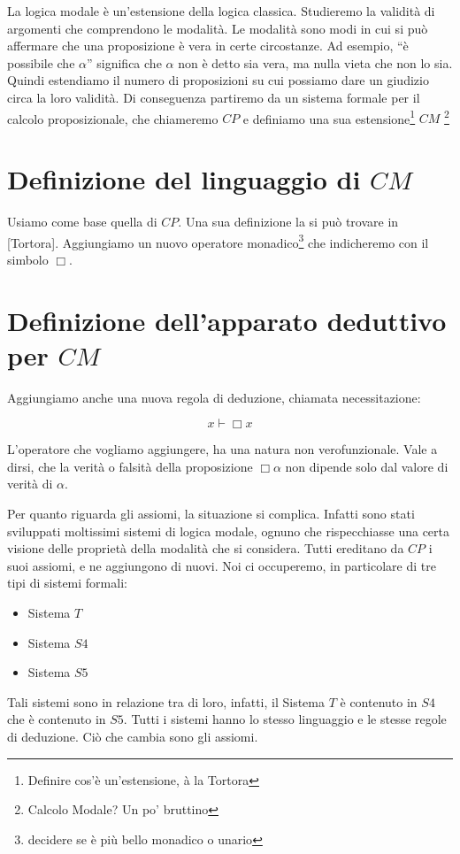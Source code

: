 \documentclass[a4paper, 12pt]{article}
\begin{document}
La logica modale è un'estensione della logica classica.
Studieremo la validità di argomenti che comprendono le modalità.
Le modalità sono modi in cui si può affermare che una proposizione è vera in certe circostanze.
Ad esempio, ``è possibile che $\alpha$'' significa che $\alpha$ non è detto sia vera, ma nulla vieta che non lo sia.
Quindi estendiamo il numero di proposizioni su cui possiamo dare un giudizio circa la loro validità.
Di conseguenza partiremo da un sistema formale per il calcolo proposizionale, che chiameremo $CP$
e definiamo una sua estensione\footnote{Definire cos'è un'estensione, à la Tortora} $CM$ \footnote{Calcolo Modale? Un po' bruttino}

\section{Definizione del linguaggio di $CM$}
Usiamo come base quella di $CP$. Una sua definizione la si può trovare in [Tortora].
Aggiungiamo un nuovo operatore monadico\footnote{decidere se è più bello monadico o unario}
che indicheremo con il simbolo $\Box$.

\section{Definizione dell'apparato deduttivo per $CM$}
Aggiungiamo anche una nuova regola di deduzione, chiamata necessitazione:

$$x \vdash \Box x$$

L'operatore che vogliamo aggiungere, ha una natura non verofunzionale. Vale a dirsi,
che la verità o falsità della proposizione $\Box \alpha$ non dipende solo
dal valore di verità di $\alpha$.

Per quanto riguarda gli assiomi, la situazione si complica. Infatti sono stati sviluppati moltissimi sistemi di logica modale,
ognuno che rispecchiasse una certa visione delle proprietà della modalità che si considera.
Tutti ereditano da $CP$ i suoi assiomi, e ne aggiungono di nuovi.
Noi ci occuperemo, in particolare di tre tipi di sistemi formali:
\begin{itemize}
\item Sistema $T$
\item Sistema $S4$
\item Sistema $S5$
\end{itemize}

Tali sistemi sono in relazione tra di loro, infatti, il Sistema $T$ è contenuto in $S4$ che è contenuto in $S5$.
Tutti i sistemi hanno lo stesso linguaggio e le stesse regole di deduzione. Ciò che cambia sono gli assiomi.
\end{document}
